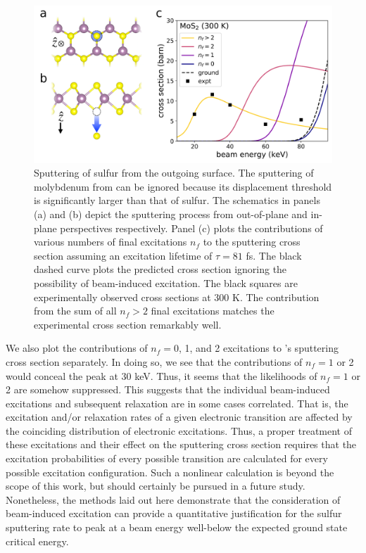 \documentclass[twoside,twocolumn,9pt]{article}
\begin{document}
\begin{figure}
  \centering
  \includegraphics[width=.9\textwidth]{figures/MoS2Cross.pdf}
  \caption{
    Sputtering of sulfur from the outgoing  surface.
    The sputtering of molybdenum from  can be ignored because its
    displacement threshold is significantly larger than that of sulfur.
    The schematics in panels (a) and (b) depict the sputtering process from
    out-of-plane and in-plane perspectives respectively.
    Panel (c) plots the contributions of various numbers of final excitations
    $n_f$ to the sputtering cross section assuming an excitation lifetime of
    $\tau=81$ fs.
    The black dashed curve plots the predicted cross section ignoring the
    possibility of beam-induced excitation.
    The black squares are experimentally observed cross sections at 300 K.
    \cite{Kretschmer2020}
    The contribution from the sum of all $n_f>2$ final excitations matches
    the experimental cross section remarkably well.
  }
  \label{fig:MoS2Cross}
\end{figure}

We also plot the contributions of $n_f = 0$, 1, and 2 excitations to 's
sputtering cross section separately.
In doing so, we see that the contributions of $n_f = 1$ or 2 would conceal the
peak at 30 keV. 
Thus, it seems that the likelihoods of $n_f = 1$ or 2 are somehow suppressed.
This suggests that the individual beam-induced excitations and subsequent
relaxation are in some cases correlated.  That is, the excitation and/or
relaxation rates of a given electronic transition are affected by the
coinciding distribution of electronic excitations.
Thus, a proper treatment of these excitations and their effect on the sputtering
cross section requires that the excitation probabilities of every possible
transition are calculated for every possible excitation configuration.
Such a nonlinear calculation is beyond the scope of this work, but
should certainly be pursued in a future study.
Nonetheless, the methods laid out here demonstrate that the consideration of
beam-induced excitation can provide a quantitative justification for the sulfur
sputtering rate to peak at a beam energy well-below the expected ground state
critical energy.
\end{document}
